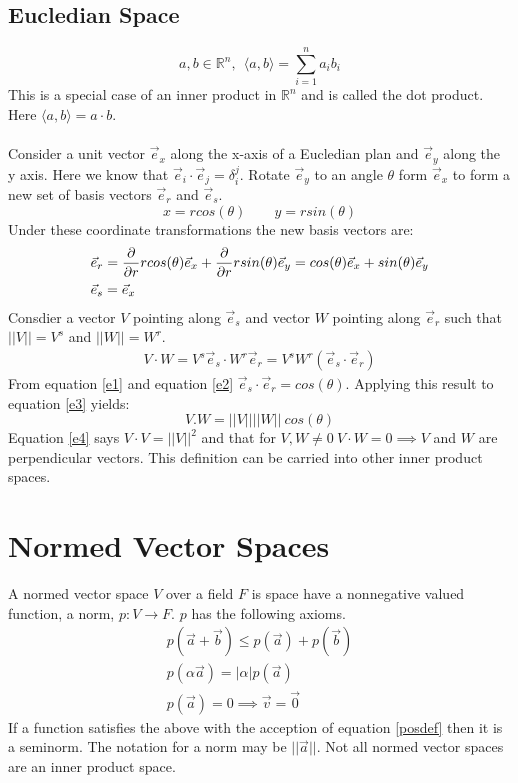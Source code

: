 \documentclass[a4paper]{article}
\newcommand{\norm}[1]{\lvert \lvert#1\rvert \rvert}
\newcommand{\inner}[1]{\langle #1 \rangle}
\begin{document}
\subsection{Eucledian Space}
\begin{equation}
  a,b \in \mathbb{R}^n, \: \: \inner{a,b} = \sum_{i=1}^n a_i b_i
\end{equation}
This is a special case of an inner product in $\mathbb{R}^n$ and is called the dot product. Here  $\inner{a,b} = a \cdot b$.
\\ \\
Consider a unit vector $\vec{e}_x$ along the x-axis of a Eucledian plan and $\vec{e}_y$ along the y axis. Here we know that $\vec{e}_i \cdot \vec{e}_j = \delta_i^j$. Rotate $\vec{e}_y$ to an angle $\theta$ form $\vec{e}_x$ to form a new set of basis vectors $\vec{e}_r$ and $\vec{e}_s$.
\begin{equation}
  x = r cos(\theta) \qquad y = r sin(\theta)
\end{equation}
Under these coordinate transformations the new basis vectors are:
\begin{align}
  &\vec{e}_r = \pdv{}{r} rcos(\theta) \vec{e}_x + \pdv{}{r} rsin(\theta) \vec{e}_y = cos(\theta)\vec{e}_x + sin(\theta)\vec{e}_y\label{e1}\\
  &\vec{e}_s = \vec{e}_x\label{e2}
\end{align}
Consdier a vector $V$ pointing along $\vec{e}_s$ and vector $W$ pointing along $\vec{e}_r$ such that $\norm{V} = V^s$ and $\norm{W}=W^r$.
\begin{align}
  V\cdot W = V^s \vec{e}_s \cdot W^r \vec{e}_r = V^s W^r (\vec{e}_s \cdot \vec{e}_r)\label{e3}
\end{align}
From equation \ref{e1} and equation \ref{e2} $\vec{e}_s \cdot \vec{e}_r = cos(\theta)$. Applying this result to equation \ref{e3} yields:
\begin{equation}
  \label{e4}
  V.W=\norm{V} \norm{W} \:cos({\theta})
\end{equation}
Equation \ref{e4} says $V \cdot V = \norm{V}^2$ and that for $V,W \ne 0 \: V\cdot W = 0 \implies V$ and $W$ are perpendicular vectors. This definition can be carried into other inner product spaces.
\section{Normed Vector Spaces}
A normed vector space $V$ over a field $F$ is space have a nonnegative valued function, a norm, $p:V \to F$. $p$ has the following axioms.
\begin{align}
  p(\vec{a}+\vec{b}) \le p(\vec{a})+p(\vec{b})\\
  p(\alpha \vec{a}) = \lvert \alpha \rvert p(\vec{a})\\
  p(\vec{a})=0 \implies \vec{v} = \vec{0}\label{posdef}
\end{align}
If a function satisfies the above with the acception of equation \ref{posdef} then it is a seminorm. The notation for a norm may be $\norm{\vec{a}}$. Not all normed vector spaces are an inner product space. 
\end{document}
